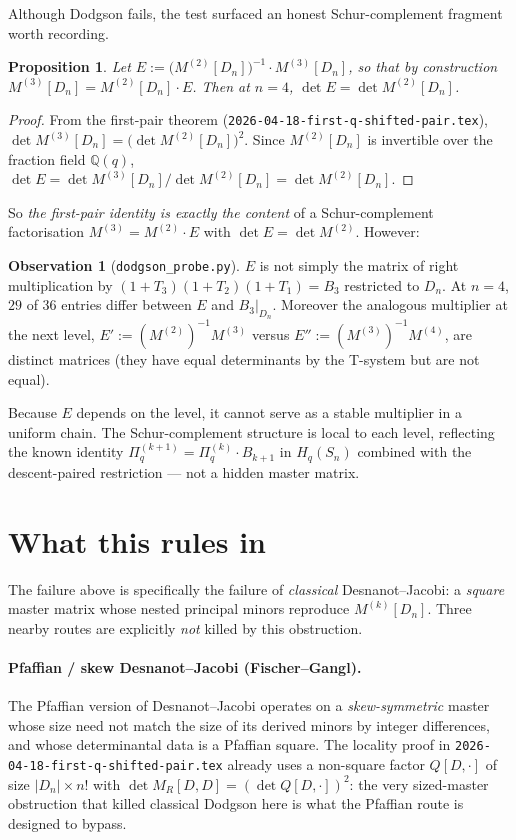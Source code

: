 \documentclass[11pt]{article}
\newtheorem{proposition}[theorem]{Proposition}
\theoremstyle{definition}
\newtheorem{observation}[theorem]{Observation}
\begin{document}
Although Dodgson fails, the test surfaced an honest Schur-complement fragment worth recording.

\begin{proposition}\label{prop:schur}
Let $E := \bigl(M^{(2)}[D_n]\bigr)^{-1}\cdot M^{(3)}[D_n]$, so that by construction $M^{(3)}[D_n] = M^{(2)}[D_n]\cdot E$. Then at $n=4$, $\det E = \det M^{(2)}[D_n]$.
\end{proposition}
\begin{proof}
From the first-pair theorem (\texttt{2026-04-18-first-q-shifted-pair.tex}), $\det M^{(3)}[D_n] = \bigl(\det M^{(2)}[D_n]\bigr)^2$. Since $M^{(2)}[D_n]$ is invertible over the fraction field $\mathbb{Q}(q)$, $\det E = \det M^{(3)}[D_n]/\det M^{(2)}[D_n] = \det M^{(2)}[D_n]$.
\end{proof}

So \emph{the first-pair identity is exactly the content} of a Schur-complement factorisation $M^{(3)} = M^{(2)}\cdot E$ with $\det E = \det M^{(2)}$. However:

\begin{observation}[\texttt{dodgson\_probe.py}]
$E$ is not simply the matrix of right multiplication by $(1+T_3)(1+T_2)(1+T_1) = B_3$ restricted to $D_n$. At $n=4$, $29$ of $36$ entries differ between $E$ and $B_3|_{D_n}$. Moreover the analogous multiplier at the next level, $E' := (M^{(2)})^{-1}M^{(3)}$ versus $E'' := (M^{(3)})^{-1}M^{(4)}$, are distinct matrices (they have equal determinants by the T-system but are not equal).
\end{observation}

Because $E$ depends on the level, it cannot serve as a stable multiplier in a uniform chain. The Schur-complement structure is local to each level, reflecting the known identity $\Pi_q^{(k+1)} = \Pi_q^{(k)}\cdot B_{k+1}$ in $H_q(S_n)$ combined with the descent-paired restriction --- not a hidden master matrix.

\section{What this rules in}\label{sec:ruled-in}

The failure above is specifically the failure of \emph{classical} Desnanot--Jacobi: a \emph{square} master matrix whose nested principal minors reproduce $M^{(k)}[D_n]$. Three nearby routes are explicitly \emph{not} killed by this obstruction.

\paragraph{Pfaffian / skew Desnanot--Jacobi (Fischer--Gangl).} The Pfaffian version of Desnanot--Jacobi operates on a \emph{skew-symmetric} master whose size need not match the size of its derived minors by integer differences, and whose determinantal data is a Pfaffian square. The locality proof in \texttt{2026-04-18-first-q-shifted-pair.tex} already uses a non-square factor $Q[D,\cdot]$ of size $|D_n|\times n!$ with $\det M_R[D,D] = (\det Q[D,\cdot])^2$: the very sized-master obstruction that killed classical Dodgson here is what the Pfaffian route is designed to bypass.
\end{document}
